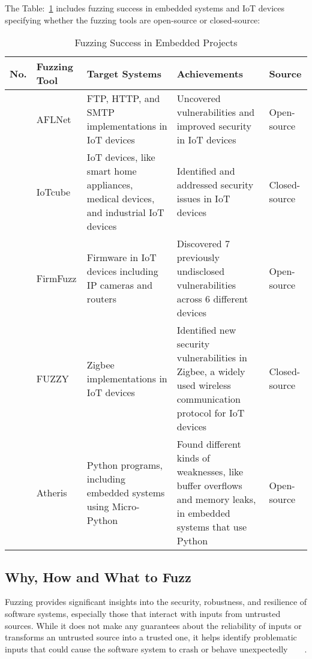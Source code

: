 
The Table:~\ref{tab:embedded_fuzzing_success} includes fuzzing success in embedded systems and IoT devices
specifying whether the fuzzing tools are open-source or closed-source:

\begin{table}[h!]
\centering
\begin{tabularx}{\textwidth}{@{}>{\raggedright\arraybackslash}p{0.5cm}>{\raggedright\arraybackslash}p{1.5cm}>{\raggedright\arraybackslash}p{3.8cm}X>{\raggedright\arraybackslash}p{1.2cm}@{}}
\toprule
\textbf{No.} & \textbf{Fuzzing Tool} & \textbf{Target Systems} & \textbf{Achievements} & \textbf{Source} \\
\midrule
1 & AFLNet & FTP, HTTP, and SMTP implementations in IoT devices & Uncovered vulnerabilities and improved security in IoT devices\cite{lin2020aflnet} & Open-source \\
\addlinespace
2 & IoTcube & IoT devices, like smart home appliances, medical devices, and industrial IoT devices & Identified and addressed security issues in IoT devices\cite{kim2019iotcube} & Closed-source \\
\addlinespace
3 & FirmFuzz & Firmware in IoT devices including IP cameras and routers & Discovered 7 previously undisclosed vulnerabilities across 6 different devices\cite{srivastava2019firmfuzz} & Open-source \\
\addlinespace
4 & FUZZY & Zigbee implementations in IoT devices & Identified new security vulnerabilities in Zigbee, a widely used wireless communication protocol for IoT devices\cite{vidas2019fuzzy} & Closed-source \\
\addlinespace
5 & Atheris & Python programs, including embedded systems using Micro-Python & Found different kinds of weaknesses, like buffer overflows and memory leaks, in embedded systems that use Python\cite{atheris2020} & Open-source \\
\bottomrule
\end{tabularx}
\caption{Fuzzing Success in Embedded Projects}
\label{tab:embedded_fuzzing_success}
\end{table}


\subsection{Why, How and What to Fuzz}

Fuzzing provides significant insights into the security, robustness,
and resilience of software systems, especially those that interact with inputs
from untrusted sources. While it does not make any guarantees about the
reliability of inputs or transforms an untrusted source into a trusted one,
it helps identify problematic inputs that could cause the software system to
crash or behave
unexpectedly~\cite{bohme2020fuzzing}~\cite{beaman2022fuzzing}~\cite{vidas2019fuzzy}~\cite{WhatisFu63:online}.

